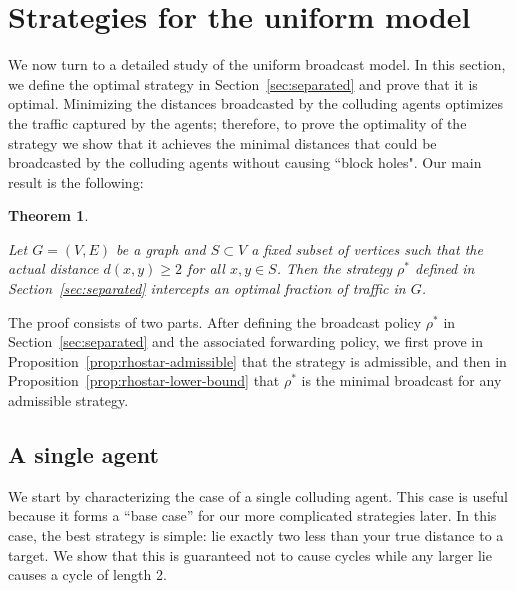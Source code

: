 \documentclass[reprint]{revtex4-1}
\newtheorem{theorem}{Theorem}[section]
\begin{document}
\section{Strategies for the uniform model} \label{sec:strategies}

We now turn to a detailed study of the uniform broadcast model. In this section,
we define the optimal strategy in Section~\ref{sec:separated} and prove that it is optimal. Minimizing the distances broadcasted by the colluding agents optimizes the traffic captured by the agents; therefore, to prove the optimality of the strategy we show that it achieves the minimal distances that could be broadcasted by the colluding agents without causing ``block holes". Our main result is the following:

\begin{theorem} \label{thm:optimal-separated}

Let $G = (V,E)$ be a graph and $S \subset V$ a fixed subset of vertices such
that the actual distance $d(x, y) \geq 2$ for all $x,y \in S$. Then the strategy $\rho^*$ defined
in Section~\ref{sec:separated} intercepts an optimal fraction of traffic in
$G$.

\end{theorem}

The proof consists of two parts. After defining the broadcast policy
$\rho^*$ in Section~\ref{sec:separated} and the associated forwarding
policy, we first prove in Proposition~\ref{prop:rhostar-admissible} that the
strategy is admissible, and then in Proposition~\ref{prop:rhostar-lower-bound}
that $\rho^*$ is the minimal broadcast for any admissible strategy.

\subsection{A single agent} \label{sec:single-agent}

We start by characterizing the case of a single colluding agent. This case is
useful because it forms a ``base case'' for our more complicated
strategies later. In this case, the best strategy is simple: lie exactly two less than
your true distance to a target. We show that this is guaranteed not to cause cycles while any larger lie causes a cycle of length 2. 
\end{document}
